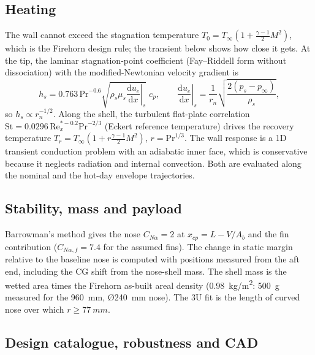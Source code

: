 \subsection{Heating}
\label{sec:heating_method}

The wall cannot exceed the stagnation temperature $T_0=T_\infty(1+\tfrac{\gamma-1}{2}M^2)$, which
is the Firehorn design rule; the transient below shows how close it gets. At the tip, the laminar
stagnation-point coefficient (Fay--Riddell form without dissociation) with the modified-Newtonian
velocity gradient is
\begin{equation}
h_s = 0.763\,\mathrm{Pr}^{-0.6}\sqrt{\rho_s\mu_s \left.\frac{\mathrm du_e}{\mathrm dx}\right|_s}\;c_p,
\qquad
\left.\frac{\mathrm du_e}{\mathrm dx}\right|_s = \frac{1}{r_n}\sqrt{\frac{2(p_s-p_\infty)}{\rho_s}} ,
\end{equation}
so $h_s \propto r_n^{-1/2}$. Along the shell, the turbulent flat-plate correlation
$\mathrm{St}=0.0296\,\mathrm{Re}_x^{*-0.2}\mathrm{Pr}^{-2/3}$ (Eckert reference temperature) drives
the recovery temperature $T_r = T_\infty(1+r\tfrac{\gamma-1}{2}M^2)$, $r=\mathrm{Pr}^{1/3}$. The
wall response is a 1D transient conduction problem with an adiabatic inner face, which is
conservative because it neglects radiation and internal convection. Both are evaluated along the
nominal and the hot-day envelope trajectories.

\subsection{Stability, mass and payload}

Barrowman's method gives the nose $C_{N\alpha}=2$ at $x_{cp}=L-V/A_b$ and the fin contribution
($C_{N\alpha,f}=7.4$ for the assumed fins). The change in static margin relative to the baseline
nose is computed with positions measured from the aft end, including the CG shift from the
nose-shell mass. The shell mass is the wetted area times the Firehorn as-built areal density
(\SI{0.98}{kg/m^2}: \SI{500}{g} measured for the \SI{960}{mm}, \O\SI{240}{mm} nose). The 3U fit is
the length of curved nose over which $r\geq\SI{77}{mm}$.

\subsection{Design catalogue, robustness and CAD}

